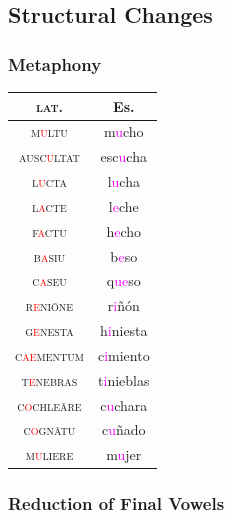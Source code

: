 \documentclass{report}[12pt]
\begin{document}
\subsection{Structural Changes}

\subsubsection{Metaphony}

\begin{tcolorbox}
  
\end{tcolorbox}

\begin{tabular}{c c}
  \textsc{lat.} & Es. \\
  \hline
  \textsc{m\textcolor{red}{u}ltu} & m\textcolor{magenta}{u}cho \\
  \textsc{ausc\textcolor{red}{u}ltat} & esc\textcolor{magenta}{u}cha \\
  \textsc{l\textcolor{red}{u}cta} & l\textcolor{magenta}{u}cha \\
  \textsc{l\textcolor{red}{a}cte} & l\textcolor{magenta}{e}che \\
  \textsc{f\textcolor{red}{a}ctu} & h\textcolor{magenta}{e}cho \\
  \textsc{b\textcolor{red}{a}siu} & b\textcolor{magenta}{e}so \\
  \textsc{c\textcolor{red}{a}seu} & q\textcolor{magenta}{ue}so \\
  \textsc{r\textcolor{red}{e}ni\={o}ne} & r\textcolor{magenta}{i}ñón \\
  \textsc{g\textcolor{red}{e}nesta} & h\textcolor{magenta}{i}niesta \\
  \textsc{c\textcolor{red}{ae}mentum} & c\textcolor{magenta}{i}miento \\
  \textsc{t\textcolor{red}{e}nebras} & t\textcolor{magenta}{i}nieblas \\
  \textsc{c\textcolor{red}{o}chle\={a}re} & c\textcolor{magenta}{u}chara \\
  \textsc{c\textcolor{red}{o}gn\={a}tu} & c\textcolor{magenta}{u}ñado \\
  \textsc{m\textcolor{red}{u}liere} & m\textcolor{magenta}ujer \\
\end{tabular}

\subsubsection{Reduction of Final Vowels}
\end{document}
